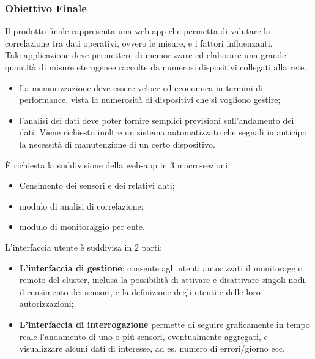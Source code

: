 	\subsubsection{Obiettivo Finale}
	Il prodotto finale rappresenta una web-app che permetta di valutare la correlazione tra dati operativi, ovvero le misure, e i fattori influenzanti.\\
	Tale applicazione deve permettere di memorizzare ed elaborare una grande quantità di misure eterogenee raccolte da numerosi dispositivi collegati alla rete.
	\begin{itemize}
		\item La memorizzazione deve essere veloce ed economica in termini di performance, vista la numerosità di dispositivi che si vogliono gestire; 
		\item l'analisi dei dati deve poter fornire semplici previsioni sull'andamento dei dati. 
		Viene richiesto inoltre un sistema automatizzato che segnali in anticipo la necessità di manutenzione di un certo dispositivo.	
	\end{itemize}
	È richiesta la suddivisione della web-app in 3 macro-sezioni:
	\begin{itemize}
		\item Censimento dei sensori e dei relativi dati; 
		\item modulo di analisi di correlazione; 
		\item modulo di monitoraggio per ente.
	\end{itemize}
	L'interfaccia utente è suddivisa in 2 parti:
	\begin{itemize}
	\item \textbf{L’interfaccia di gestione}: consente agli utenti autorizzati il monitoraggio remoto del cluster, inclusa la possibilità di attivare e disattivare singoli nodi, il censimento dei sensori, e la definizione degli utenti e delle loro autorizzazioni; 
	\item \textbf{L’interfaccia di interrogazione} permette di seguire graficamente in tempo reale l’andamento di uno o più sensori, eventualmente aggregati, e visualizzare alcuni dati di interesse, ad es. numero di errori/giorno ecc.
	\end{itemize}
